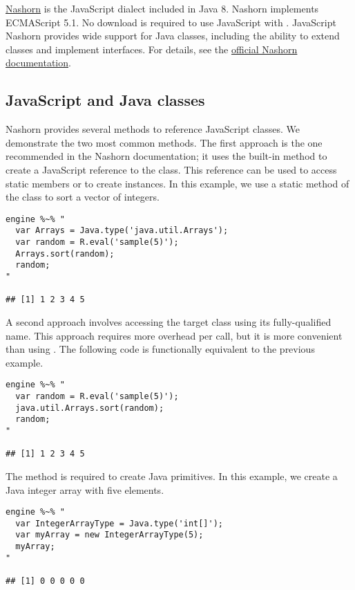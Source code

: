 \href{https://docs.oracle.com/javase/8/docs/technotes/guides/scripting/nashorn/}{Nashorn} is the JavaScript dialect included in Java 8. Nashorn implements ECMAScript 5.1. No download is required to use JavaScript with . JavaScript Nashorn provides wide support for Java classes, including the ability to extend classes and implement interfaces. For details, see the \href{https://docs.oracle.com/javase/8/docs/technotes/guides/scripting/nashorn/}{official Nashorn documentation}.

\subsection{JavaScript and Java classes}

Nashorn provides several methods to reference JavaScript classes. We demonstrate the two most common methods. The first approach is the one recommended in the Nashorn documentation; it uses the built-in  method to create a JavaScript reference to the class. This reference can be used to access static members or to create instances. In this example, we use a static method of the  class to sort a vector of integers.

\begin{verbatim}
engine %~% "
  var Arrays = Java.type('java.util.Arrays');
  var random = R.eval('sample(5)');
  Arrays.sort(random);
  random;
"

## [1] 1 2 3 4 5
\end{verbatim}

A second approach involves accessing the target class using its fully-qualified name. This approach requires more overhead per call, but it is more convenient than using . The following code is functionally equivalent to the previous example.

\begin{verbatim}
engine %~% "
  var random = R.eval('sample(5)');
  java.util.Arrays.sort(random);
  random;
"

## [1] 1 2 3 4 5
\end{verbatim}

The  method is required to create Java primitives. In this example, we create a Java integer array with five elements.

\begin{verbatim}
engine %~% "
  var IntegerArrayType = Java.type('int[]');
  var myArray = new IntegerArrayType(5);
  myArray;
"

## [1] 0 0 0 0 0
\end{verbatim}

